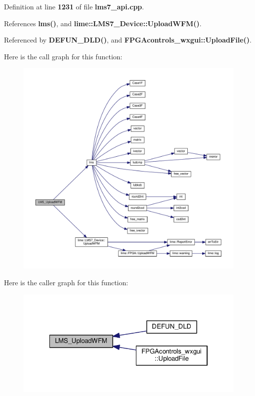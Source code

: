 Definition at line {\bf 1231} of file {\bf lms7\+\_\+api.\+cpp}.



References {\bf lms()}, and {\bf lime\+::\+L\+M\+S7\+\_\+\+Device\+::\+Upload\+W\+F\+M()}.



Referenced by {\bf D\+E\+F\+U\+N\+\_\+\+D\+L\+D()}, and {\bf F\+P\+G\+Acontrols\+\_\+wxgui\+::\+Upload\+File()}.



Here is the call graph for this function\+:
\nopagebreak
\begin{figure}[H]
\begin{center}
\leavevmode
\includegraphics[width=350pt]{df/de1/lms7__api_8cpp_a39a8acd245a2fe634b228c8fdfc3dbb0_cgraph}
\end{center}
\end{figure}




Here is the caller graph for this function\+:
\nopagebreak
\begin{figure}[H]
\begin{center}
\leavevmode
\includegraphics[width=322pt]{df/de1/lms7__api_8cpp_a39a8acd245a2fe634b228c8fdfc3dbb0_icgraph}
\end{center}
\end{figure}


